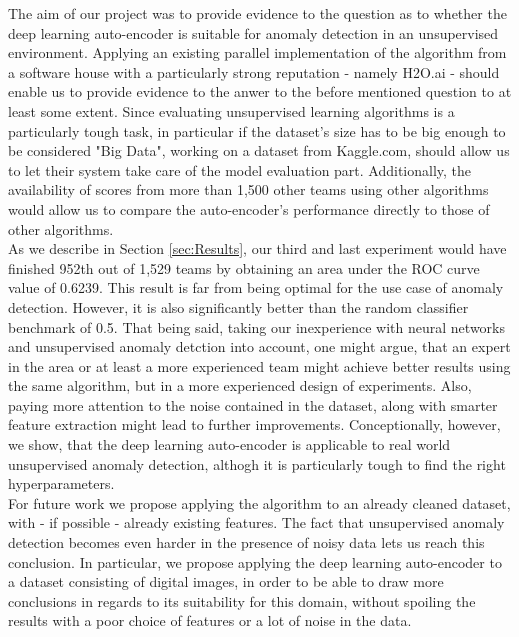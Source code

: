 \documentclass{vldb}
\begin{document}
The aim of our project was to provide evidence to the question as to whether the deep learning auto-encoder is suitable for anomaly detection in an unsupervised environment. Applying an existing parallel implementation of the algorithm from a software house with a particularly strong reputation - namely H2O.ai - should enable us to provide evidence to the anwer to the before mentioned question to at least some extent. Since evaluating unsupervised learning algorithms is a particularly tough task, in particular if the dataset's size has to be big enough to be considered "Big Data", working on a dataset from Kaggle.com, should allow us to let their system take care of the model evaluation part. Additionally, the availability of scores from more than 1,500 other teams using other algorithms would allow us to compare the auto-encoder's performance directly to those of other algorithms.\\
As we describe in Section \ref{sec:Results}, our third and last experiment would have finished 952th out of 1,529 teams by obtaining an area under the ROC curve value of 0.6239. This result is far from being optimal for the use case of anomaly detection. However, it is also significantly better than the random classifier benchmark of 0.5. That being said, taking our inexperience with neural networks and unsupervised anomaly detction into account, one might argue, that an expert in the area or at least a more experienced team might achieve better results using the same algorithm, but in a more experienced design of experiments. Also, paying more attention to the noise contained in the dataset, along with smarter feature extraction might lead to further improvements. Conceptionally, however, we show, that the deep learning auto-encoder is applicable to real world unsupervised anomaly detection, althogh it is particularly tough to find the right hyperparameters. \\
For future work we propose applying the algorithm to an already cleaned dataset, with - if possible - already existing features. The fact that unsupervised anomaly detection becomes even harder in the presence of noisy data lets us reach this conclusion. In particular, we propose applying the deep learning auto-encoder to a dataset consisting of digital images, in order to be able to draw more conclusions in regards to its suitability for this domain, without spoiling the results with a poor choice of features or a lot of noise in the data.


\end{document}
